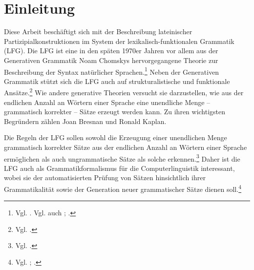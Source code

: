 \documentclass[12pt,a4paper]{article}
\begin{document}

\setcounter{page}{2}
\begingroup
\flushbottom
\begin{spacing}{1.25}
\tableofcontents
\end{spacing}
\thispagestyle{empty}
\pagebreak
\endgroup

\nocite{Menge}
\nocite{LHS}
\nocite{KSt}
\nocite{Rohrer}
\nocite{Skript}
\nocite{Dal}
\nocite{Falk}
\nocite{Bresnan}
\nocite{Snijders}
\nocite{DAZ}



\section{Einleitung}
Diese Arbeit beschäftigt sich mit der Beschreibung lateinischer Partizipialkonstruktionen im System der lexikalisch-funktionalen Grammatik (LFG). Die LFG ist eine in den späten 1970er Jahren vor allem aus der Generativen Grammatik Noam Chomskys hervorgegangene Theorie zur Beschreibung der Syntax natürlicher Sprachen.\footnote{Vgl. \cite[4]{Skript}. Vgl. auch \cite[1]{Dal}; \cite[3]{Bresnan}.} Neben der Generativen Grammatik stützt sich die LFG auch auf strukturalistische und funktionale Ansätze.\footnote{Vgl. \cite[3]{Bresnan}.} Wie andere generative Theorien versucht sie darzustellen, wie aus der endlichen Anzahl an Wörtern einer Sprache eine unendliche Menge -- grammatisch korrekter -- Sätze erzeugt werden kann. Zu ihren wichtigsten Begründern zählen Joan Bresnan und Ronald Kaplan.

Die Regeln der LFG sollen sowohl die Erzeugung einer unendlichen Menge grammatisch korrekter Sätze aus der endlichen Anzahl an Wörtern einer Sprache ermöglichen als auch ungrammatische Sätze als solche erkennen.\footnote{Vgl. \cite[18]{Skript}.} Daher ist die LFG auch als Grammatikformalismus für die Computerlinguistik interessant, wobei sie der automatisierten Prüfung von Sätzen hinsichtlich ihrer Grammatikalität sowie der Generation neuer grammatischer Sätze dienen soll.\footnote{Vgl. \cite[18]{Skript}; \cite[vii]{Bresnan}.}
 
\end{document}

